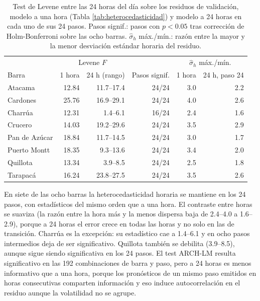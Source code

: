 \begin{table}[htbp]
    \centering
    \small
    \begin{tabular}{lrrrrr}
        \toprule
        & \multicolumn{2}{c}{Levene $F$} & & \multicolumn{2}{c}{$\hat\sigma_h$ máx./mín.} \\
        Barra & 1 hora & 24 h (rango) & Pasos signif. & 1 hora & 24 h, paso 24 \\
        \midrule
        Atacama       & 12.84 & 11.7--17.4 & 24/24 & 3.0 & 2.2 \\
        Cardones      & 25.76 & 16.9--29.1 & 24/24 & 4.0 & 2.6 \\
        Charrúa       & 12.31 & 1.4--6.1   & 16/24 & 2.4 & 1.6 \\
        Crucero       & 14.03 & 19.2--29.6 & 24/24 & 3.5 & 2.9 \\
        Pan de Azúcar & 18.84 & 11.7--14.5 & 24/24 & 3.0 & 1.7 \\
        Puerto Montt  & 18.35 & 9.3--13.6  & 24/24 & 3.4 & 2.0 \\
        Quillota      & 13.34 & 3.9--8.5   & 24/24 & 2.5 & 1.8 \\
        Tarapacá      & 16.24 & 23.8--27.5 & 24/24 & 3.5 & 2.6 \\
        \bottomrule
    \end{tabular}
    \vspace{0.2cm}
    \caption{Test de Levene entre las 24 horas del día sobre los residuos de validación, modelo a una hora (Tabla \ref{tab:heterocedasticidad}) y modelo a 24 horas en cada uno de sus 24 pasos. Pasos signif.: pasos con $p<0.05$ tras corrección de Holm-Bonferroni sobre las ocho barras. $\hat\sigma_h$ máx./mín.: razón entre la mayor y la menor desviación estándar horaria del residuo.}
    \label{tab:h24_hetero}
\end{table}

En siete de las ocho barras la heterocedasticidad horaria se mantiene en los 24 pasos, con estadísticos del mismo orden que a una hora. El contraste entre horas se suaviza (la razón entre la hora más y la menos dispersa baja de 2.4--4.0 a 1.6--2.9), porque a 24 horas el error crece en todas las horas y no solo en las de transición. Charrúa es la excepción: su estadístico cae a 1.4--6.1 y en ocho pasos intermedios deja de ser significativo. Quillota también se debilita (3.9--8.5), aunque sigue siendo significativa en los 24 pasos. El test ARCH-LM resulta significativo en las 192 combinaciones de barra y paso, pero a 24 horas es menos informativo que a una hora, porque los pronósticos de un mismo paso emitidos en horas consecutivas comparten información y eso induce autocorrelación en el residuo aunque la volatilidad no se agrupe.

